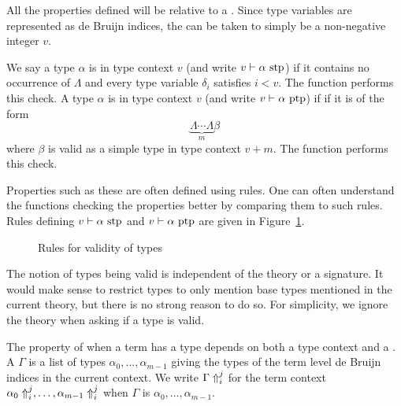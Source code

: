 All the properties defined will be relative to a
{}.
Since type variables are represented
as de Bruijn indices, the {}
can be taken to simply be a non-negative integer $v$.

We say a type $\alpha$ is {} in type context $v$
(and write $v\vdash \alpha \stp$) if
it contains no occurrence of $\Lambda$ and every type variable $\delta_i$ satisfies $i<v$.
The function {} performs this check.
A type $\alpha$ is {} in type context $v$
(and write $v\vdash \alpha \ptp$) if
if
it is of the form
$$\underbrace{\Lambda\cdots\Lambda}_m\beta$$
where $\beta$ is valid as a simple type in type context $v+m$.
The function {} performs this check.

Properties such as these are often defined
using rules. One can often understand the functions checking the properties
better by comparing them to such rules.
Rules defining $v\vdash \alpha\stp$
and $v\vdash \alpha\ptp$
are given in Figure~\ref{fig:tp}.

\begin{figure}
\begin{center}
\end{center}
\caption{Rules for validity of types}\label{fig:tp}
\end{figure}

The notion of types being valid is independent of the theory or a signature.
It would make sense to restrict types to only mention base types 
mentioned in the current theory, but there is no strong reason to do so.
For simplicity, we ignore the theory when asking if a type is valid.

The property of when a term has a type
depends on both a type context and a {}.
A {} $\Gamma$ is a list of types
$\alpha_0,\ldots,\alpha_{m-1}$
giving the types of the term level de Bruijn indices
in the current context.
We write $\dbtpsh{i}{j}\Gamma$ for the term context
$\dbtpsh{i}{j}{\alpha_0},\ldots,\dbtpsh{i}{j}{\alpha_{m-1}}$
when $\Gamma$ is $\alpha_0,\ldots,\alpha_{m-1}$.

